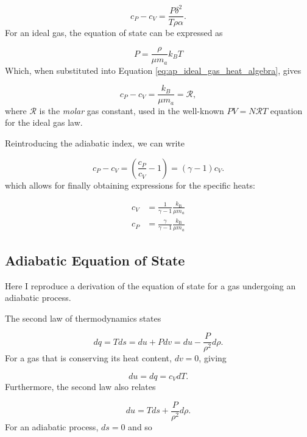 \documentclass[12pt]{article}
\begin{document}
\begin{equation}
    c_P - c_V = \frac{P\delta^2}{T\rho \alpha}. \label{eq:ap_ideal_gas_heat_algebra2}
\end{equation}
%
For an ideal gas, the equation of state can be expressed as 

\begin{equation}
    P = \frac{\rho}{\mu m_a} k_B T
\end{equation}
%
Which, when substituted into Equation \ref{eq:ap_ideal_gas_heat_algebra}, gives

\begin{equation}
    c_P - c_V = \frac{k_B}{\mu m_a} = \mathscr{R},
\end{equation}
%
where $\mathscr{R}$ is the \textit{molar} gas constant, used in the well-known $PV = N\mathscr{R}T$ equation for the ideal gas law.

Reintroducing the adiabatic index, we can write

\begin{equation}
    c_P - c_V = \left(\frac{c_P}{c_V} - 1 \right) = \left(\gamma - 1 \right) c_V.
\end{equation}
%
which allows for finally obtaining expressions for the specific heats:

\begin{align}
    c_V &= \frac{1}{\gamma-1} \frac{k_\mathrm{B}}{\mu m_a} \\
    c_P &= \frac{\gamma}{\gamma - 1} \frac{k_\mathrm{B}}{\mu m_a}
\end{align}

\subsection{Adiabatic Equation of State} 
Here I reproduce a derivation of the equation of state for a gas undergoing an adiabatic process.

The second law of thermodynamics states

\begin{equation}
    dq = Tds = du + Pdv = du - \frac{P}{\rho^2}d\rho.
\end{equation}
%
For a gas that is conserving its heat content, $dv = 0$, giving

\begin{equation}
    du = dq = c_V dT. \label{eq:ap_ad_eos1}
\end{equation}
%
Furthermore, the second law also relates

\begin{equation}
    du = Tds + \frac{P}{\rho^2} d\rho.
\end{equation}
%
For an adiabatic process, $ds = 0$ and so
\end{document}
